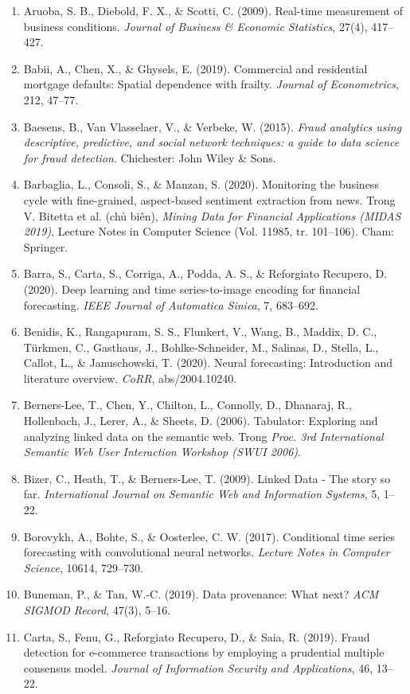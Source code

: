 \begin{enumerate}
\item Aruoba, S. B., Diebold, F. X., \& Scotti, C. (2009). Real-time measurement of business conditions. \emph{Journal of Business \& Economic Statistics}, 27(4), 417--427.
\item Babii, A., Chen, X., \& Ghysels, E. (2019). Commercial and residential mortgage defaults: Spatial dependence with frailty. \emph{Journal of Econometrics}, 212, 47--77.
\item Baesens, B., Van Vlasselaer, V., \& Verbeke, W. (2015). \emph{Fraud analytics using descriptive, predictive, and social network techniques: a guide to data science for fraud detection}. Chichester: John Wiley \& Sons.
\item Barbaglia, L., Consoli, S., \& Manzan, S. (2020). Monitoring the business cycle with fine-grained, aspect-based sentiment extraction from news. Trong V. Bitetta et al. (chủ biên), \emph{Mining Data for Financial Applications (MIDAS 2019)}, Lecture Notes in Computer Science (Vol. 11985, tr. 101--106). Cham: Springer.
\item Barra, S., Carta, S., Corriga, A., Podda, A. S., \& Reforgiato Recupero, D. (2020). Deep learning and time series-to-image encoding for financial forecasting. \emph{IEEE Journal of Automatica Sinica}, 7, 683--692.
\item Benidis, K., Rangapuram, S. S., Flunkert, V., Wang, B., Maddix, D. C., Türkmen, C., Gasthaus, J., Bohlke-Schneider, M., Salinas, D., Stella, L., Callot, L., \& Januschowski, T. (2020). Neural forecasting: Introduction and literature overview. \emph{CoRR}, abs/2004.10240.
\item Berners-Lee, T., Chen, Y., Chilton, L., Connolly, D., Dhanaraj, R., Hollenbach, J., Lerer, A., \& Sheets, D. (2006). Tabulator: Exploring and analyzing linked data on the semantic web. Trong \emph{Proc. 3rd International Semantic Web User Interaction Workshop (SWUI 2006)}.
\item Bizer, C., Heath, T., \& Berners-Lee, T. (2009). Linked Data - The story so far. \emph{International Journal on Semantic Web and Information Systems}, 5, 1--22.
\item Borovykh, A., Bohte, S., \& Oosterlee, C. W. (2017). Conditional time series forecasting with convolutional neural networks. \emph{Lecture Notes in Computer Science}, 10614, 729--730.
\item Buneman, P., \& Tan, W.-C. (2019). Data provenance: What next? \emph{ACM SIGMOD Record}, 47(3), 5--16.
\item Carta, S., Fenu, G., Reforgiato Recupero, D., \& Saia, R. (2019). Fraud detection for e-commerce transactions by employing a prudential multiple consensus model. \emph{Journal of Information Security and Applications}, 46, 13--22.

\end{enumerate}
